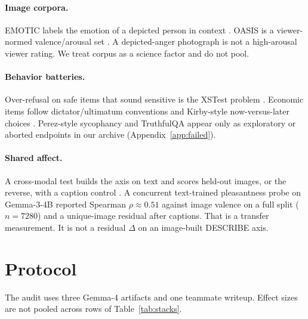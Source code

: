 \documentclass{article}
\begin{document}
\paragraph{Image corpora.}
EMOTIC labels the emotion of a depicted person in context \citep{kosti2017emotion,kosti2019emotic}. OASIS is a viewer-normed valence/arousal set \citep{kurdi2017oasis}. A depicted-anger photograph is not a high-arousal viewer rating. We treat corpus as a science factor and do not pool.

\paragraph{Behavior batteries.}
Over-refusal on safe items that sound sensitive is the XSTest problem \citep{rottger2024xstest}. Economic items follow dictator/ultimatum conventions \citep{forsythe1994fairness} and Kirby-style now-versus-later choices \citep{kirby2000discounting}. Perez-style sycophancy \citep{perez2022discovering} and TruthfulQA \citep{lin2022truthfulqa} appear only as exploratory or aborted endpoints in our archive (Appendix~\ref{app:failed}).

\paragraph{Shared affect.}
A cross-modal test builds the axis on text and scores held-out images, or the reverse, with a caption control \citep{campbell1959convergent}. A concurrent text-trained pleasantness probe on Gemma-3-4B reported Spearman $\rho \approx 0.51$ against image valence on a full split ($n=7280$) and a unique-image residual after captions. That is a transfer measurement. It is not a residual $\Delta$ on an image-built DESCRIBE axis.

\section{Protocol}
\label{sec:protocol}

The audit uses three Gemma-4 artifacts and one teammate writeup. Effect sizes are not pooled across rows of Table~\ref{tab:stacks}.
\end{document}

